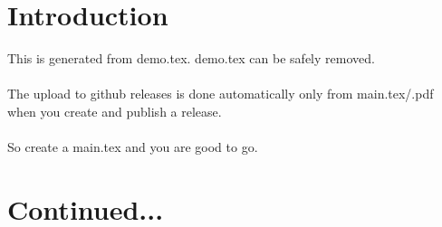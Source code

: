 \documentclass{article}
\begin{document}
\pagestyle{fancy}
\title{\myTitle}
\author{\myNameInclTitle}
\date{\docversion}
\fancyhf{} %
\fancyfoot[L]{\thepage}
\fancyfoot[C]{\docversion}
\maketitle
\section{Introduction}
This is generated from demo.tex. demo.tex can be safely removed.\\\\
The upload to github releases is done automatically only from main.tex/.pdf when you create and publish a release.\\\\
So create a main.tex and you are good to go.
\newpage
\section{Continued...}
\end{document}
